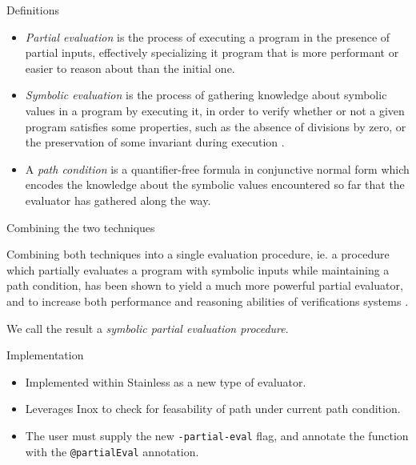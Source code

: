 \documentclass[ignorenonframetext,]{beamer}
\providecommand{\tightlist}{%
  \setlength{\itemsep}{0pt}\setlength{\parskip}{0pt}}
\begin{document}
\begin{frame}{%
\protect\hypertarget{definitions}{%
Definitions}}

\begin{itemize}
\tightlist
\item
  \emph{Partial evaluation} \cite{Jones:1993:PEA:153676} is the process
  of executing a program in the presence of partial inputs, effectively
  specializing it program that is more performant or easier to reason
  about than the initial one.
\end{itemize}

\pause

\begin{itemize}
\tightlist
\item
  \emph{Symbolic evaluation}
  \cite{King:1970:PV:905403, King:1976:SEP:360248.360252} is the process
  of gathering knowledge about symbolic values in a program by executing
  it, in order to verify whether or not a given program satisfies some
  properties, such as the absence of divisions by zero, or the
  preservation of some invariant during execution
  \cite{DBLP:journals/corr/BaldoniCDDF16}.
\end{itemize}

\pause

\begin{itemize}
\tightlist
\item
  A \emph{path condition} is a quantifier-free formula in conjunctive
  normal form which encodes the knowledge about the symbolic values
  encountered so far that the evaluator has gathered along the way.
\end{itemize}

\end{frame}

\begin{frame}{%
\protect\hypertarget{combining-the-two-techniques}{%
Combining the two techniques}}

Combining both techniques into a single evaluation procedure, ie. a
procedure which partially evaluates a program with symbolic inputs while
maintaining a path condition, has been shown to yield a much more
powerful partial evaluator, and to increase both performance and
reasoning abilities of verifications systems \cite{partialsym}.

We call the result a \emph{symbolic partial evaluation procedure}.

\end{frame}

\begin{frame}[fragile]{%
\protect\hypertarget{implementation}{%
Implementation}}

\begin{itemize}
\tightlist
\item
  Implemented within Stainless as a new type of evaluator.
\item
  Leverages Inox to check for feasability of path under current path
  condition.
\item
  The user must supply the new \texttt{-partial-eval} flag, and annotate
  the function with the \texttt{@partialEval} annotation.
\end{itemize}

\end{frame}
\end{document}
